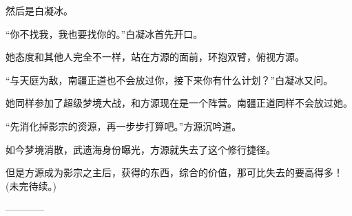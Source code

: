 \begin{this_body}
然后是白凝冰。

“你不找我，我也要找你的。”白凝冰首先开口。

她态度和其他人完全不一样，站在方源的面前，环抱双臂，俯视方源。

“与天庭为敌，南疆正道也不会放过你，接下来你有什么计划？”白凝冰又问。

她同样参加了超级梦境大战，和方源现在是一个阵营。南疆正道同样不会放过她。

“先消化掉影宗的资源，再一步步打算吧。”方源沉吟道。

如今梦境消散，武遗海身份曝光，方源就失去了这个修行捷径。

但是方源成为影宗之主后，获得的东西，综合的价值，那可比失去的要高得多！(未完待续。)

------------

\end{this_body}

